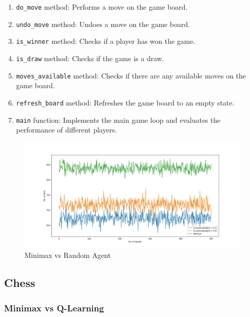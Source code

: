 \documentclass{article}
\begin{document}
\begin{enumerate}
  \item \texttt{do\_move} method: Performs a move on the game board.
  \item \texttt{undo\_move} method: Undoes a move on the game board.
  \item \texttt{is\_winner} method: Checks if a player has won the game.
  \item \texttt{is\_draw} method: Checks if the game is a draw.
  \item \texttt{moves\_available} method: Checks if there are any available moves on the game board.
  \item \texttt{refresh\_board} method: Refreshes the game board to an empty state.
  \item \texttt{main} function: Implements the main game loop and evaluates the performance of different players.
\end{enumerate}
\begin{figure}[htbp]
    \centering
    \includegraphics[width=1.2\textwidth]{img 56.jpg}
    \caption{Minimax vs Random Agent}
    \label{fig:example}
\end{figure}


\subsection{Chess}

\subsubsection{Minimax vs Q-Learning}
\end{document}
